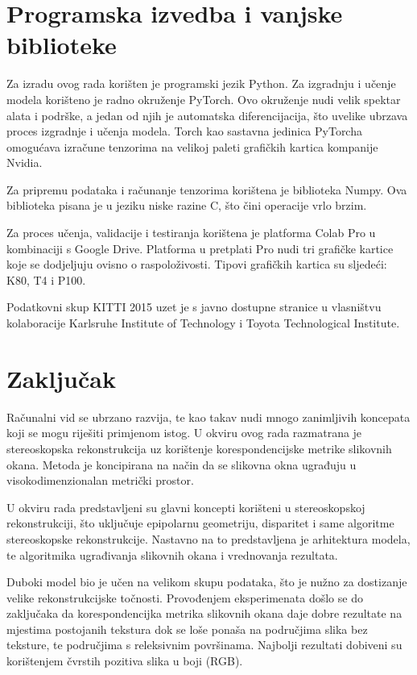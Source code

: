 \documentclass[times, utf8, zavrsni, numeric]{fer}
\begin{document}
\chapter{Programska izvedba i vanjske biblioteke}
Za izradu ovog rada korišten je programski jezik Python. Za izgradnju  i učenje modela korišteno je radno okruženje PyTorch. Ovo okruženje nudi velik spektar alata i podrške, a jedan od njih je automatska diferencijacija, što uvelike ubrzava proces izgradnje i učenja modela. Torch kao sastavna jedinica PyTorcha omogućava izračune tenzorima na velikoj paleti grafičkih kartica kompanije Nvidia.

 Za pripremu podataka i računanje tenzorima korištena je biblioteka Numpy. Ova biblioteka pisana je u jeziku niske razine C, što čini operacije vrlo brzim.
 
Za proces učenja, validacije i testiranja korištena je platforma Colab Pro u kombinaciji s Google Drive. Platforma u pretplati Pro nudi tri grafičke kartice koje se dodjeljuju ovisno o raspoloživosti. Tipovi grafičkih kartica su sljedeći: K80, T4 i P100.

Podatkovni skup KITTI 2015 uzet je s javno dostupne stranice u vlasništvu kolaboracije Karlsruhe Institute of Technology i Toyota Technological Institute. 
\chapter{Zaključak}
Računalni vid se ubrzano razvija, te kao takav nudi mnogo zanimljivih koncepata koji se mogu riješiti primjenom istog. U okviru ovog rada razmatrana je stereoskopska rekonstrukcija uz korištenje korespondencijske metrike slikovnih okana. Metoda je koncipirana na način da se slikovna okna ugrađuju u visokodimenzionalan metrički prostor. 

U okviru rada predstavljeni su glavni koncepti korišteni u stereoskopskoj rekonstrukciji, što uključuje epipolarnu geometriju, disparitet i same algoritme stereoskopske rekonstrukcije. Nastavno na to predstavljena je arhitektura modela, te algoritmika ugrađivanja slikovnih okana i vrednovanja rezultata.

Duboki model bio je učen na velikom skupu podataka, što je nužno za dostizanje velike rekonstrukcijske točnosti. Provođenjem eksperimenata došlo se do zaključaka da korespondencijka metrika slikovnih okana daje dobre rezultate na mjestima postojanih tekstura dok se loše ponaša na područjima slika bez teksture, te područjima s releksivnim površinama. Najbolji rezultati dobiveni su korištenjem čvrstih pozitiva slika u boji (RGB).
\end{document}
